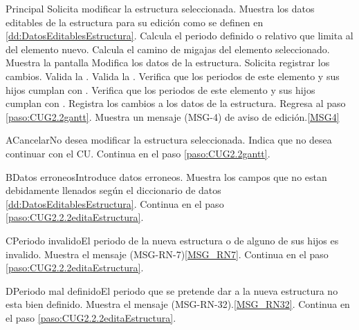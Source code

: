 	\begin{UCtrayectoria}{Principal}
		\UCpaso[\UCactor] Solicita modificar la estructura seleccionada.
		\UCpaso Muestra los datos editables de la estructura para su edición como se definen en \ref{dd:DatosEditablesEstructura}. \label{paso:CUG2.2.2editaEstructura}
		\UCpaso Calcula el periodo definido o relativo que limita al del elemento nuevo.
		\UCpaso Calcula el camino de migajas del elemento seleccionado.
		\UCpaso Muestra la pantalla 
		\UCpaso [\UCactor] Modifica los datos de la estructura.
		\UCpaso [\UCactor] Solicita registrar los cambios. 
		\UCpaso Valida la  .
		\UCpaso Valida la  . 
		\UCpaso Verifica que los periodos de este elemento y sus hijos cumplan con  .
		\UCpaso Verifica que los periodos de este elemento y sus hijos cumplan con  .
		\UCpaso Registra los cambios a los datos de la estructura.
		\UCpaso Regresa al paso \ref{paso:CUG2.2gantt}.
		\UCpaso Muestra un mensaje (MSG-4) de aviso de edición.\ref{MSG4}
	\end{UCtrayectoria}

	\begin{UCtrayectoriaA}{A}{Cancelar}{No desea modificar la estructura seleccionada.}
		\UCpaso[\UCactor] Indica que no desea continuar con el CU.
		\UCpaso Continua en el paso \ref{paso:CUG2.2gantt}.
	\end{UCtrayectoriaA}

	\begin{UCtrayectoriaA}{B}{Datos erroneos}{Introduce datos erroneos.}
		\UCpaso Muestra los campos que no estan debidamente llenados según el diccionario de datos \ref{dd:DatosEditablesEstructura}.
		\UCpaso Continua en el paso \ref{paso:CUG2.2.2editaEstructura}.
	\end{UCtrayectoriaA}

	\begin{UCtrayectoriaA}{C}{Periodo invalido}{El periodo de la nueva estructura o de alguno de sus hijos es invalido.}
		\UCpaso Muestra el mensaje (MSG-RN-7)\ref{MSG_RN7}.
		\UCpaso Continua en el paso \ref{paso:CUG2.2.2editaEstructura}.
	\end{UCtrayectoriaA}

	\begin{UCtrayectoriaA}{D}{Periodo mal definido}{El periodo que se pretende dar a la nueva estructura no esta bien definido.}
		\UCpaso Muestra el mensaje (MSG-RN-32).\ref{MSG_RN32}.
		\UCpaso Continua en el paso \ref{paso:CUG2.2.2editaEstructura}.
	\end{UCtrayectoriaA}


